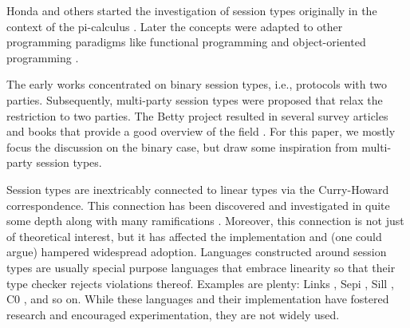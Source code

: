 \documentclass[acmsmall,review,anonymous,screen]{acmart}
\begin{document}
Honda and others
\cite{DBLP:conf/concur/Honda93,DBLP:conf/parle/TakeuchiHK94,DBLP:conf/esop/HondaVK98}
started the investigation of session types originally in the context
of the pi-calculus \cite{DBLP:journals/iandc/MilnerPW92a}. Later the concepts were adapted to other programming
paradigms like functional programming
\cite{DBLP:journals/tcs/VasconcelosGR06,DBLP:journals/jfp/GayV10} and
object-oriented programming
\cite{DBLP:conf/europar/RavaraV97,DBLP:journals/corr/abs-1205-5344}. 

The early works concentrated on binary session types, i.e., protocols
with two parties. Subsequently, multi-party session types were
proposed \cite{DBLP:journals/jacm/HondaYC16} that relax the
restriction to two parties. The Betty project resulted in several survey articles
and books that provide a good overview of the field
\cite{gay17:_behav_types,DBLP:journals/csur/HuttelLVCCDMPRT16,DBLP:journals/jlp/BartolettiCDDGP15,DBLP:journals/ftpl/AnconaBB0CDGGGH16}. 
For this paper, we mostly focus the discussion on the binary case, but draw some
inspiration from multi-party session types.


Session types are inextricably connected to linear types via the
Curry-Howard correspondence. This connection has been discovered and
investigated in quite some depth
\cite{DBLP:conf/concur/CairesP10,DBLP:journals/mscs/CairesPT16,DBLP:journals/jfp/Wadler14}
along with many ramifications \cite{DBLP:journals/pacmpl/BalzerP17}. 
Moreover, this connection is not just of theoretical interest, but it
has affected the implementation and (one could argue) hampered widespread
adoption. Languages constructed around session types are usually
special purpose languages that embrace linearity so that their type
checker rejects violations thereof. Examples are plenty: Links \cite{lindley17:_light_funct_session_types},
Sepi \cite{DBLP:conf/sefm/FrancoV13,DBLP:conf/sfm/Vasconcelos09}, Sill
\cite{DBLP:conf/esop/ToninhoCP13}, C0
\cite{DBLP:journals/corr/WillseyPP17}, and so on.
While these languages and their implementation have fostered research
and encouraged experimentation, they are not widely used.
\end{document}
